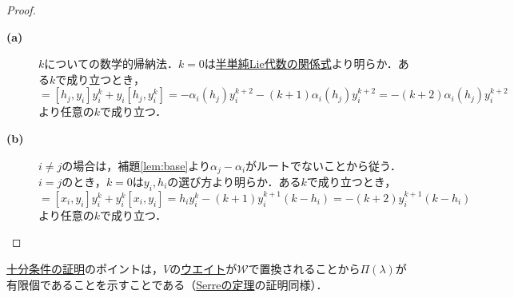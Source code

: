 \documentclass[rep_main]{subfiles}
\begin{document}
\begin{proof}
	\begin{description}
		\item[\textbf{(a)}] $k$についての数学的帰納法．$k=0$は\hyperref[prop:semisimple-Lie-alg-relation]{半単純Lie代数の関係式}より明らか．ある$k$で成り立つとき，
		\begin{equation}
			[h_j, y_i^{k+1}] = [h_j, y_i]y_i^k + y_i[h_j, y_i^k] = -\alpha_i(h_j)y_i^{k+2} - (k+1)\alpha_i(h_j)y_i^{k+2} = - (k+2)\alpha_i(h_j)y_i^{k+2}
		\end{equation}
		より任意の$k$で成り立つ．
		\item[\textbf{(b)}] $i \neq j$の場合は，補題\ref{lem:base}より$\alpha_j - \alpha_i$がルートでないことから従う．\\
		$i = j$のとき，$k = 0$は$y_i, h_i$の選び方より明らか．ある$k$で成り立つとき，
		\begin{equation}
			[x_i, y_i^{k+1}] = [x_i, y_i]y_i^k + y_i^k[x_i, y_i] = h_iy_i^k - (k+1)y_i^{k+1}(k - h_i) = -(k+2)y_i^{k+1}(k - h_i)
		\end{equation}
		より任意の$k$で成り立つ．
	\end{description}
\end{proof}
\hyperref[thm:suff-for-finite]{十分条件の証明}のポイントは，$V$の\hyperref[def:weight-rep]{ウエイト}が$\mathscr{W}$で置換されることから$\Pi(\lambda)$が有限個であることを示すことである（\hyperref[thm:Serre]{Serreの定理}の証明同様）．
\end{document}
